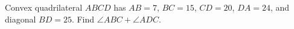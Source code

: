 Convex quadrilateral $ABCD$ has $AB=7$, $BC=15$, $CD=20$, $DA=24$, and diagonal $BD=25$. Find $\angle ABC+\angle ADC$.
